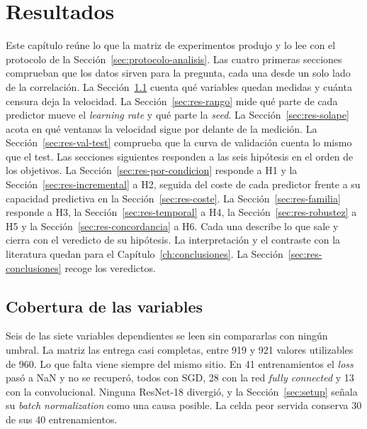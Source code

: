\chapter{Resultados}
\label{ch:resultados}

Este capítulo reúne lo que la matriz de experimentos produjo y lo lee con el protocolo de la Sección~\ref{sec:protocolo-analisis}. Las cuatro primeras secciones comprueban que los datos sirven para la pregunta, cada una desde un solo lado de la correlación. La Sección~\ref{sec:res-cobertura} cuenta qué variables quedan medidas y cuánta censura deja la velocidad. La Sección~\ref{sec:res-rango} mide qué parte de cada predictor mueve el \emph{learning rate} y qué parte la \emph{seed}. La Sección~\ref{sec:res-solape} acota en qué ventanas la velocidad sigue por delante de la medición. La Sección~\ref{sec:res-val-test} comprueba que la curva de validación cuenta lo mismo que el test. Las secciones siguientes responden a las seis hipótesis en el orden de los objetivos. La Sección~\ref{sec:res-por-condicion} responde a H1 y la Sección~\ref{sec:res-incremental} a H2, seguida del coste de cada predictor frente a su capacidad predictiva en la Sección~\ref{sec:res-coste}. La Sección~\ref{sec:res-familia} responde a H3, la Sección~\ref{sec:res-temporal} a H4, la Sección~\ref{sec:res-robustez} a H5 y la Sección~\ref{sec:res-concordancia} a H6. Cada una describe lo que sale y cierra con el veredicto de su hipótesis. La interpretación y el contraste con la literatura quedan para el Capítulo~\ref{ch:conclusiones}. La Sección~\ref{sec:res-conclusiones} recoge los veredictos.

\section{Cobertura de las variables}
\label{sec:res-cobertura}

Seis de las siete variables dependientes se leen sin compararlas con ningún umbral. La matriz las entrega casi completas, entre 919 y 921 valores utilizables de 960. Lo que falta viene siempre del mismo sitio. En 41 entrenamientos el \emph{loss} pasó a NaN y no se recuperó, todos con SGD, 28 con la red \emph{fully connected} y 13 con la convolucional. Ninguna ResNet-18 divergió, y la Sección~\ref{sec:setup} señala su \emph{batch normalization} como una causa posible. La celda peor servida conserva 30 de sus 40 entrenamientos.

